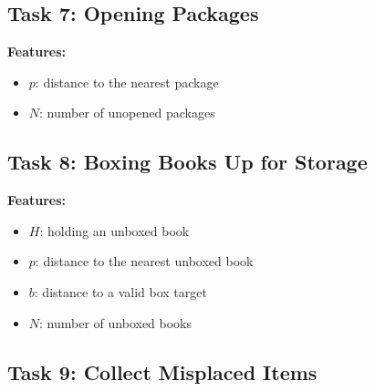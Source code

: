\subsection{Task 7: Opening Packages}

\textbf{Features:}
\begin{itemize}[noitemsep]
    \item $p$: distance to the nearest package
    \item $N$: number of unopened packages
\end{itemize}


\subsection{Task 8: Boxing Books Up for Storage}

\textbf{Features:}
\begin{itemize}[noitemsep]
    \item $H$: holding an unboxed book
    \item $p$: distance to the nearest unboxed book
    \item $b$: distance to a valid box target
    \item $N$: number of unboxed books
\end{itemize}


\subsection{Task 9: Collect Misplaced Items}

